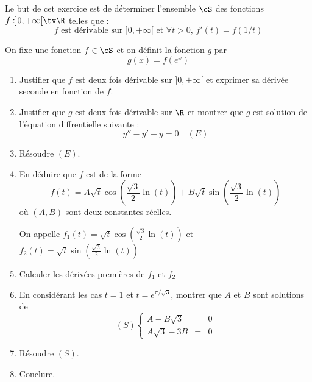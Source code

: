 \documentclass[a4paper, 11pt,reqno]{article}
\begin{document}


\begin{exercice}
Le but de cet exercice est de déterminer l'ensemble $\cS$ des fonctions
$f :]0,+\infty[\tv \R$ telles que : 
$$ \text{$f$ est dérivable sur $]0,+\infty[$ et } \forall t>0, \, f'(t) = f(1/t)$$

On fixe une fonction $f\in \cS$ et on définit la fonction $g$ par 
$$g(x) =f(e^{x})$$
\begin{enumerate}
\item Justifier que $f$ est deux fois dérivable sur $]0,+\infty[$ et exprimer sa dérivée seconde en fonction de $f$. 
\item Justifier que $g$ est deux fois dérivable sur $\R$ et montrer que $g$ est solution de l'équation diffrentielle suivante : 
$$y''-y'+y=0\quad(E)$$
\item Résoudre $(E)$. 
\item En déduire que $f$ est de la forme $$f(t) = A \sqrt{t}  \cos\left(\frac{\sqrt{3}}{2}\ln(t)\right) +B\sqrt{t}  \sin\left(\frac{\sqrt{3}}{2}\ln(t)\right)$$ où $(A,B)$ sont deux constantes réelles.

On appelle $f_1(t) =  \sqrt{t}  \cos\left(\frac{\sqrt{3}}{2}\ln(t)\right)$ et 
$f_2(t)= \sqrt{t}  \sin\left(\frac{\sqrt{3}}{2}\ln(t)\right)$
\item Calculer les dérivées premières de $f_1$ et $f_2$
\item En considérant les cas $t=1$ et $t=e^{\pi/\sqrt{3}}$, montrer que $A$ et $B$ sont solutions de
$$(S) \left\{ \begin{array}{ccc}
A-B\sqrt{3}&=&0\\
A\sqrt{3}-3B&=&0
\end{array}\right.$$
\item Résoudre $(S)$. 
\item Conclure. 
\end{enumerate} 
\end{exercice}
\end{document}
